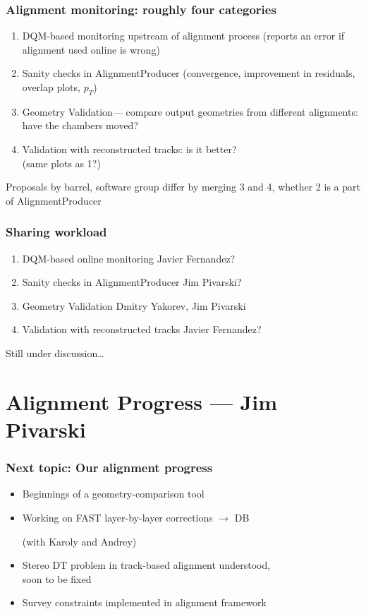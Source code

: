 \documentclass[compress]{beamer}
\begin{document}
\begin{frame}
\frametitle{Alignment monitoring: roughly four categories}
\begin{enumerate}\setlength{\itemsep}{0.4 cm}
\item DQM-based monitoring upstream of alignment process (reports an error if alignment used online is wrong)
\item Sanity checks in AlignmentProducer (convergence, improvement in residuals, overlap plots, $p_T$)
\item Geometry Validation--- compare output geometries from different alignments: have the chambers moved?
\item Validation with reconstructed tracks: is it better? \\ (same plots as \textcolor{dkblue}{1}?)
\end{enumerate}

\vfill Proposals by barrel, software group differ by merging
\textcolor{dkblue}{3} and \textcolor{dkblue}{4}, whether
\textcolor{dkblue}{2} is a part of AlignmentProducer
\end{frame}

\begin{frame}
\frametitle{Sharing workload}
\begin{enumerate}\setlength{\itemsep}{0.5 cm}
\item DQM-based online monitoring \hfill \textcolor{dkblue}{Javier Fernandez?}
\item Sanity checks in AlignmentProducer \hfill \textcolor{dkblue}{Jim Pivarski?}
\item Geometry Validation \hfill \textcolor{dkblue}{Dmitry Yakorev, Jim Pivarski}
\item Validation with reconstructed tracks \hfill \textcolor{dkblue}{Javier Fernandez?}
\end{enumerate}

\vfill Still under discussion\ldots
\end{frame}

\section*{Alignment Progress --- Jim Pivarski}

\begin{frame}
\frametitle{Next topic: Our alignment progress}

\begin{itemize}\setlength{\itemsep}{0.5 cm}
\item Beginnings of a geometry-comparison tool
\item Working on FAST layer-by-layer corrections $\to$ DB

\vspace{0.25 cm}
(with Karoly and Andrey) 
\item Stereo DT problem in track-based alignment understood, \\ soon to be fixed
\item Survey constraints implemented in alignment framework
\end{itemize}
\end{frame}
\end{document}
